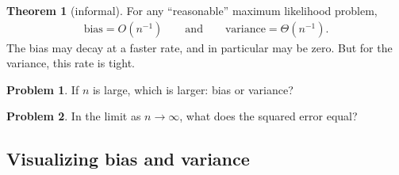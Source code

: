 \documentclass[10pt]{article}
\theoremstyle{definition}
\newtheorem{theorem}{Theorem}
\newtheorem{problem}{Problem}
\newcommand{\w}{\mathbf w}
\newcommand{\wstar}{\w^*}
\begin{document}
\begin{theorem}[informal]
    For any ``reasonable'' maximum likelihood problem, 
    \begin{align}
        \text{bias} = O(n^{-1}) \qquad \text{and} \qquad
        \text{variance} = \Theta(n^{-1}).
    \end{align}
    The bias may decay at a faster rate, and in particular may be zero.
    But for the variance, this rate is tight.
\end{theorem}

\newpage

\begin{problem}
    If $n$ is large, which is larger: bias or variance?
\end{problem}
\vspace{0.5in}

\begin{problem}
    In the limit as $n\to\infty$, what does the squared error equal?
\end{problem}
\vspace{0.5in}

\subsection*{Visualizing bias and variance}

\begin{center}
\end{center}

\vspace{1in}
\end{document}
